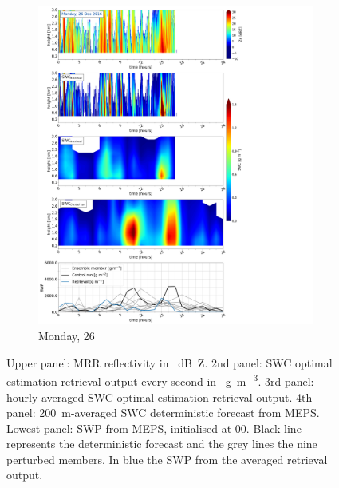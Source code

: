     \begin{figure}\ContinuedFloat
   		\centering
		\begin{subfigure}[b]{0.8\textwidth}
			\includegraphics[trim={0.5cm 0.5cm 17.5cm .5cm},clip,width=\textwidth]{./fig_SWC/20161226}
			\caption{Monday, \SI{26}{\dec}}\label{fig:SWC26}
		\end{subfigure}
        \caption{Upper panel: MRR reflectivity in \SI{}{\dB Z}. 2nd panel: SWC optimal estimation retrieval output every second in \SI{}{\gram\per\cubic\metre}. 3rd panel: hourly-averaged SWC optimal estimation retrieval output. 4th panel: \SI{200}{\metre}-averaged SWC deterministic forecast from MEPS. Lowest panel: SWP from MEPS, initialised at \SI{00}{\UTC}. Black line represents the deterministic forecast and the grey lines the nine perturbed members. In blue the SWP from the averaged retrieval output.}\label{fig:SWC}
	\end{figure}
	
